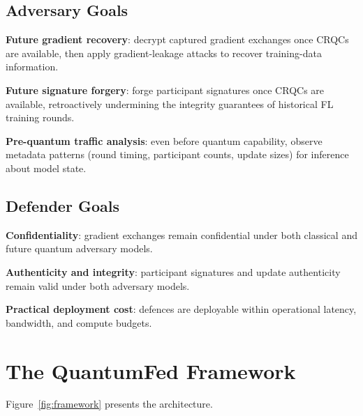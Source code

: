 \documentclass[sigconf,nonacm]{acmart}
\begin{document}
\subsection{Adversary Goals}

\textbf{Future gradient recovery}: decrypt captured gradient
exchanges once CRQCs are available, then apply gradient-leakage
attacks to recover training-data information.

\textbf{Future signature forgery}: forge participant signatures
once CRQCs are available, retroactively undermining the integrity
guarantees of historical FL training rounds.

\textbf{Pre-quantum traffic analysis}: even before quantum
capability, observe metadata patterns (round timing, participant
counts, update sizes) for inference about model state.

\subsection{Defender Goals}

\textbf{Confidentiality}: gradient exchanges remain confidential
under both classical and future quantum adversary models.

\textbf{Authenticity and integrity}: participant signatures and
update authenticity remain valid under both adversary models.

\textbf{Practical deployment cost}: defences are deployable within
operational latency, bandwidth, and compute budgets.

\section{The QuantumFed Framework}

Figure~\ref{fig:framework} presents the architecture.
\end{document}

